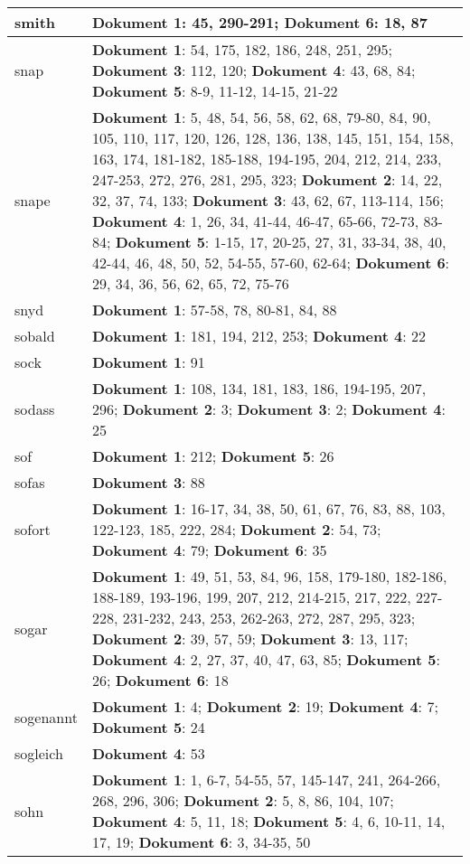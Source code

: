 \documentclass[a5paper]{article}
\begin{document}
\begin{longtable}[l]{|l|p{3in}|}
\hline
smith & \textbf{Dokument 1}: 45, 290-291; \textbf{Dokument 6}: 18, 87 \\
\hline
snap & \textbf{Dokument 1}: 54, 175, 182, 186, 248, 251, 295; \textbf{Dokument 3}: 112, 120; \textbf{Dokument 4}: 43, 68, 84; \textbf{Dokument 5}: 8-9, 11-12, 14-15, 21-22 \\
\hline
snape & \textbf{Dokument 1}: 5, 48, 54, 56, 58, 62, 68, 79-80, 84, 90, 105, 110, 117, 120, 126, 128, 136, 138, 145, 151, 154, 158, 163, 174, 181-182, 185-188, 194-195, 204, 212, 214, 233, 247-253, 272, 276, 281, 295, 323; \textbf{Dokument 2}: 14, 22, 32, 37, 74, 133; \textbf{Dokument 3}: 43, 62, 67, 113-114, 156; \textbf{Dokument 4}: 1, 26, 34, 41-44, 46-47, 65-66, 72-73, 83-84; \textbf{Dokument 5}: 1-15, 17, 20-25, 27, 31, 33-34, 38, 40, 42-44, 46, 48, 50, 52, 54-55, 57-60, 62-64; \textbf{Dokument 6}: 29, 34, 36, 56, 62, 65, 72, 75-76 \\
\hline
snyd & \textbf{Dokument 1}: 57-58, 78, 80-81, 84, 88 \\
\hline
sobald & \textbf{Dokument 1}: 181, 194, 212, 253; \textbf{Dokument 4}: 22 \\
\hline
sock & \textbf{Dokument 1}: 91 \\
\hline
sodass & \textbf{Dokument 1}: 108, 134, 181, 183, 186, 194-195, 207, 296; \textbf{Dokument 2}: 3; \textbf{Dokument 3}: 2; \textbf{Dokument 4}: 25 \\
\hline
sof & \textbf{Dokument 1}: 212; \textbf{Dokument 5}: 26 \\
\hline
sofas & \textbf{Dokument 3}: 88 \\
\hline
sofort & \textbf{Dokument 1}: 16-17, 34, 38, 50, 61, 67, 76, 83, 88, 103, 122-123, 185, 222, 284; \textbf{Dokument 2}: 54, 73; \textbf{Dokument 4}: 79; \textbf{Dokument 6}: 35 \\
\hline
sogar & \textbf{Dokument 1}: 49, 51, 53, 84, 96, 158, 179-180, 182-186, 188-189, 193-196, 199, 207, 212, 214-215, 217, 222, 227-228, 231-232, 243, 253, 262-263, 272, 287, 295, 323; \textbf{Dokument 2}: 39, 57, 59; \textbf{Dokument 3}: 13, 117; \textbf{Dokument 4}: 2, 27, 37, 40, 47, 63, 85; \textbf{Dokument 5}: 26; \textbf{Dokument 6}: 18 \\
\hline
sogenannt & \textbf{Dokument 1}: 4; \textbf{Dokument 2}: 19; \textbf{Dokument 4}: 7; \textbf{Dokument 5}: 24 \\
\hline
sogleich & \textbf{Dokument 4}: 53 \\
\hline
sohn & \textbf{Dokument 1}: 1, 6-7, 54-55, 57, 145-147, 241, 264-266, 268, 296, 306; \textbf{Dokument 2}: 5, 8, 86, 104, 107; \textbf{Dokument 4}: 5, 11, 18; \textbf{Dokument 5}: 4, 6, 10-11, 14, 17, 19; \textbf{Dokument 6}: 3, 34-35, 50 \\

\end{longtable}
\end{document}
